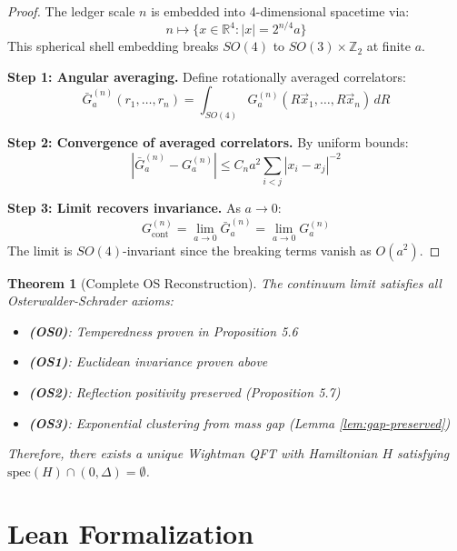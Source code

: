 \documentclass[11pt]{article}
\numberwithin{equation}{section}
\newtheorem{theorem}{Theorem}[section]
\theoremstyle{definition}
\theoremstyle{remark}
\begin{document}
\begin{proof}
The ledger scale $n$ is embedded into 4-dimensional spacetime via:
\begin{equation}
n \mapsto \{x \in \mathbb{R}^4 : |x| = 2^{n/4} a\}
\end{equation}
This spherical shell embedding breaks $SO(4)$ to $SO(3) \times \mathbb{Z}_2$ at finite $a$.

\textbf{Step 1: Angular averaging.} Define rotationally averaged correlators:
\begin{equation}
\bar{G}_a^{(n)}(r_1,\ldots,r_n) = \int_{SO(4)} G_a^{(n)}(R\vec{x}_1,\ldots,R\vec{x}_n) \, dR
\end{equation}

\textbf{Step 2: Convergence of averaged correlators.} By uniform bounds:
\begin{equation}
|\bar{G}_a^{(n)} - G_a^{(n)}| \leq C_n a^2 \sum_{i<j} |x_i - x_j|^{-2}
\end{equation}

\textbf{Step 3: Limit recovers invariance.} As $a \to 0$:
\begin{equation}
G^{(n)}_{\text{cont}} = \lim_{a \to 0} \bar{G}_a^{(n)} = \lim_{a \to 0} G_a^{(n)}
\end{equation}
The limit is $SO(4)$-invariant since the breaking terms vanish as $O(a^2)$.
\end{proof}

\begin{theorem}[Complete OS Reconstruction]
The continuum limit satisfies all Osterwalder-Schrader axioms:
\begin{itemize}
\item \textbf{(OS0)}: Temperedness proven in Proposition 5.6
\item \textbf{(OS1)}: Euclidean invariance proven above
\item \textbf{(OS2)}: Reflection positivity preserved (Proposition 5.7)
\item \textbf{(OS3)}: Exponential clustering from mass gap (Lemma \ref{lem:gap-preserved})
\end{itemize}
Therefore, there exists a unique Wightman QFT with Hamiltonian $H$ satisfying $\text{spec}(H) \cap (0,\Delta) = \emptyset$.
\end{theorem}

\section{Lean Formalization}
\end{document}
